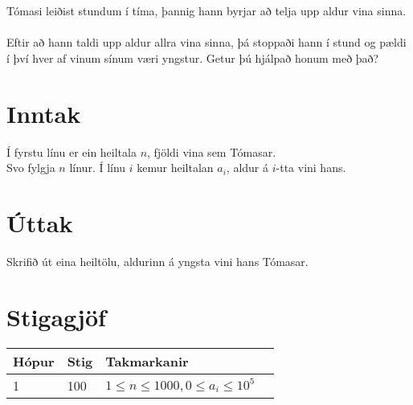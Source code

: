 Tómasi leiðist stundum í tíma, þannig hann byrjar að telja upp aldur vina sinna. \\
\\
Eftir að hann taldi upp aldur allra vina sinna, þá stoppaði hann í stund og pældi í því hver af vinum sínum væri yngstur. Getur þú hjálpað honum með það? \\

\section*{Inntak}
Í fyrstu línu er ein heiltala $n$, fjöldi vina sem Tómasar. \\
Svo fylgja $n$ línur. Í línu $i$ kemur heiltalan $a_{i}$, aldur á $i$-tta vini hans. \\
\section*{Úttak}
Skrifið út eina heiltölu, aldurinn á yngsta vini hans Tómasar. \\

\section*{Stigagjöf}
\begin{tabular}{|l|l|l|l|}
\hline
Hópur & Stig & Takmarkanir \\ \hline
1     & 100     & $1 \leq n \leq 1000, 0 \leq a_i \leq 10^5$ \\ \hline
\end{tabular}
